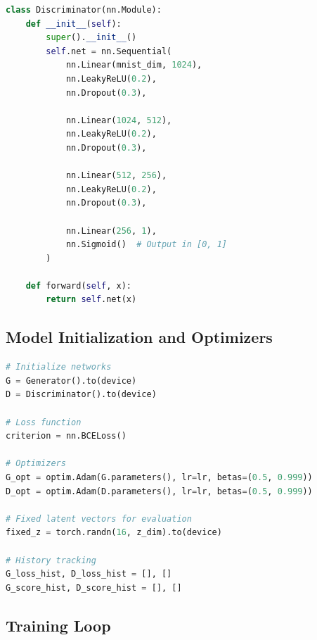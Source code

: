 \documentclass[12pt,a4paper]{article}
\begin{document}
\begin{lstlisting}[language=Python, caption=Discriminator Network Implementation]
class Discriminator(nn.Module):
    def __init__(self):
        super().__init__()
        self.net = nn.Sequential(
            nn.Linear(mnist_dim, 1024),
            nn.LeakyReLU(0.2),
            nn.Dropout(0.3),
            
            nn.Linear(1024, 512),
            nn.LeakyReLU(0.2),
            nn.Dropout(0.3),
            
            nn.Linear(512, 256),
            nn.LeakyReLU(0.2),
            nn.Dropout(0.3),
            
            nn.Linear(256, 1),
            nn.Sigmoid()  # Output in [0, 1]
        )
    
    def forward(self, x):
        return self.net(x)
\end{lstlisting}

\subsection{Model Initialization and Optimizers}

\begin{lstlisting}[language=Python, caption=Model initialization and optimization setup]
# Initialize networks
G = Generator().to(device)
D = Discriminator().to(device)

# Loss function
criterion = nn.BCELoss()

# Optimizers
G_opt = optim.Adam(G.parameters(), lr=lr, betas=(0.5, 0.999))
D_opt = optim.Adam(D.parameters(), lr=lr, betas=(0.5, 0.999))

# Fixed latent vectors for evaluation
fixed_z = torch.randn(16, z_dim).to(device)

# History tracking
G_loss_hist, D_loss_hist = [], []
G_score_hist, D_score_hist = [], []
\end{lstlisting}

\subsection{Training Loop}
\end{document}
